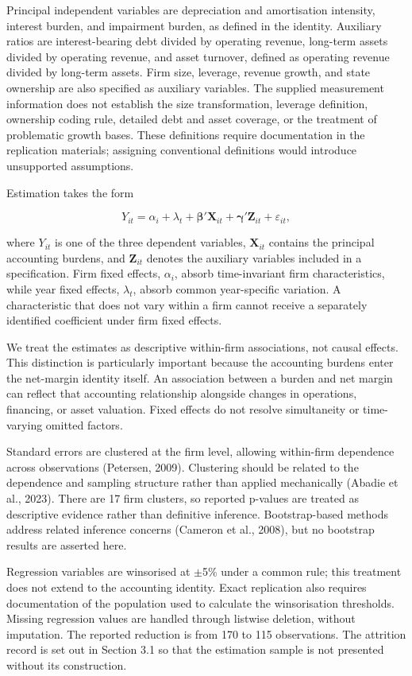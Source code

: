 \documentclass[review,3p,times]{elsarticle}
\begin{document}
Principal independent variables are depreciation and amortisation intensity, interest burden, and impairment burden, as defined in the identity. Auxiliary ratios are interest-bearing debt divided by operating revenue, long-term assets divided by operating revenue, and asset turnover, defined as operating revenue divided by long-term assets. Firm size, leverage, revenue growth, and state ownership are also specified as auxiliary variables. The supplied measurement information does not establish the size transformation, leverage definition, ownership coding rule, detailed debt and asset coverage, or the treatment of problematic growth bases. These definitions require documentation in the replication materials; assigning conventional definitions would introduce unsupported assumptions.

Estimation takes the form

\[
Y_{it}=\alpha_i+\lambda_t+\boldsymbol{\beta}'\mathbf{X}_{it}
+\boldsymbol{\gamma}'\mathbf{Z}_{it}+\varepsilon_{it},
\]

where $Y_{it}$ is one of the three dependent variables, $\mathbf{X}_{it}$ contains the principal accounting burdens, and $\mathbf{Z}_{it}$ denotes the auxiliary variables included in a specification. Firm fixed effects, $\alpha_i$, absorb time-invariant firm characteristics, while year fixed effects, $\lambda_t$, absorb common year-specific variation. A characteristic that does not vary within a firm cannot receive a separately identified coefficient under firm fixed effects.

We treat the estimates as descriptive within-firm associations, not causal effects. This distinction is particularly important because the accounting burdens enter the net-margin identity itself. An association between a burden and net margin can reflect that accounting relationship alongside changes in operations, financing, or asset valuation. Fixed effects do not resolve simultaneity or time-varying omitted factors.

Standard errors are clustered at the firm level, allowing within-firm dependence across observations (Petersen, 2009). Clustering should be related to the dependence and sampling structure rather than applied mechanically (Abadie et al., 2023). There are 17 firm clusters, so reported p-values are treated as descriptive evidence rather than definitive inference. Bootstrap-based methods address related inference concerns (Cameron et al., 2008), but no bootstrap results are asserted here.

Regression variables are winsorised at \ensuremath{\pm}5\% under a common rule; this treatment does not extend to the accounting identity. Exact replication also requires documentation of the population used to calculate the winsorisation thresholds. Missing regression values are handled through listwise deletion, without imputation. The reported reduction is from 170 to 115 observations. The attrition record is set out in Section 3.1 so that the estimation sample is not presented without its construction.
\end{document}
